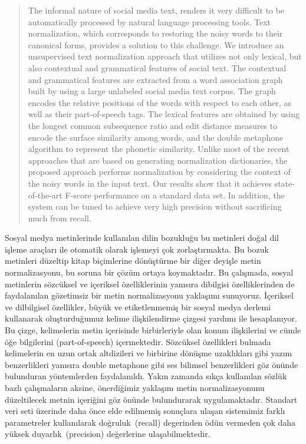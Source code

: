 \documentclass[a4paper,onesided,12pt]{report}
\begin{document}
\begin{abstract}
The informal nature of social media text, renders it very difficult to be automatically processed by natural language processing tools. Text normalization, which corresponds to restoring the noisy words to their canonical forms, provides a solution to this challenge.
We introduce an unsupervised text normalization approach that utilizes not only lexical, but also contextual and grammatical features of social text.
The contextual and grammatical features are extracted from a word association graph built by using a large unlabeled social media text corpus.
The graph encodes the relative positions of the words with respect to each other, as well as their part-of-speech tags.
The lexical features are obtained by using the longest common subsequence ratio and edit distance measures to encode the surface similarity among words, and the double metaphone algorithm to represent the phonetic similarity. Unlike most of the recent approaches that are based on generating normalization dictionaries, the proposed approach performs normalization by considering the context of the noisy words in the input text.
Our results show that it achieves state-of-the-art F-score performance on a standard data set. In addition, the system can be tuned to achieve very high precision without sacrificing much from recall.
\end{abstract}
\begin{ozet}
Sosyal medya metinlerinde kullanılan dilin bozukluğu bu metinleri doğal dil işleme araçları ile otomatik olarak işlemeyi çok zorlaştırmakta. Bu bozuk metinleri düzeltip kitap biçimlerine dönüştürme bir diğer deyişle metin normalizasyonu, bu soruna bir çözüm ortaya koymaktadır.
Bu çalışmada, sosyal metinlerin sözcüksel ve içeriksel özelliklerinin yanısıra dibilgisi özelliklerinden de faydalanılan gözetimsiz bir metin normalizasyonu yaklaşımı sunuyoruz.
İçeriksel ve dilbilgisel özellikler, büyük ve etiketlenmemiş bir sosyal medya derlemi kullanarak oluşturduğumuz kelime ilişkilendirme çizgesi yardımı ile hesaplanıyor. Bu çizge, kelimelerin metin içerisinde birbirleriyle olan konum ilişkilerini ve cümle öğe bilgilerini (part-of-speech) içermektedir.
Sözcüksel özellikleri bulmada kelimelerin en uzun ortak altdizileri ve birbirine dönüşme uzaklıkları gibi yazım benzerlikleri yanısıra double metaphone gibi ses bilimsel benzerlikleri göz önünde bulunduran yöntemlerden faydalanıldı. Yakın zamanda sıkça kullanılan sözlük bazlı çalışmaların aksine, önerdiğimiz yaklaşım metin normalizasyonunu düzeltilecek metnin içeriğini göz önünde bulundurarak uygulamaktadır.
Standart veri seti üzerinde daha önce elde edilmemiş sonuçlara ulaşan sistemimiz farklı parametreler kullanılarak doğruluk~(recall) degerinden ödün vermeden çok daha yüksek duyarlık~(precision) değerlerine ulaşabilmektedir.
\end{ozet}
\end{document}
